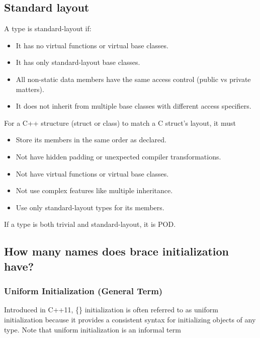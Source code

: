 \documentclass{report}
\begin{document}
    \subsection{Standard layout}
    \bigbreak \noindent 
    A type is standard-layout if:
    \begin{itemize}
        \item It has no virtual functions or virtual base classes.
        \item It has only standard-layout base classes.
        \item All non-static data members have the same access control (public vs private matters).
        \item It does not inherit from multiple base classes with different access specifiers.
    \end{itemize}
    \bigbreak \noindent 
    For a C++ structure (struct or class) to match a C struct's layout, it must
    \begin{itemize}
        \item Store its members in the same order as declared.
        \item Not have hidden padding or unexpected compiler transformations.
        \item Not have virtual functions or virtual base classes.
        \item Not use complex features like multiple inheritance.
        \item Use only standard-layout types for its members.
    \end{itemize}
    \bigbreak \noindent 
    If a type is both trivial and standard-layout, it is POD.

    \pagebreak 
    \bigbreak \noindent 
    \subsection{How many names does brace initialization have?}
    \bigbreak \noindent 
    \subsubsection{Uniform Initialization (General Term)}
    \bigbreak \noindent 
    Introduced in C++11, \{\} initialization is often referred to as uniform initialization because it provides a consistent syntax for initializing objects of any type.
    \bigbreak \noindent 
    Note that uniform initialization is an informal term
\end{document}
